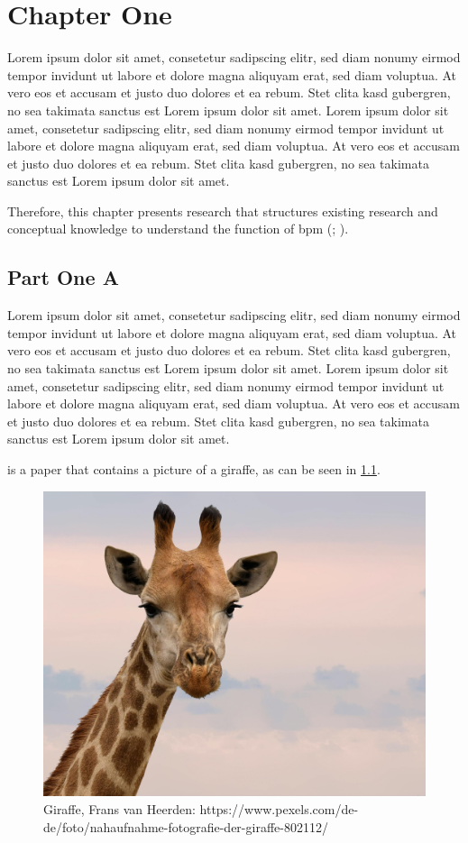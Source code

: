 \chapter{Chapter One}
\label{cha:one}

Lorem ipsum dolor sit amet, consetetur sadipscing elitr, sed diam nonumy eirmod tempor invidunt ut labore et dolore magna aliquyam erat, sed diam voluptua. At vero eos et accusam et justo duo dolores et ea rebum. Stet clita kasd gubergren, no sea takimata sanctus est Lorem ipsum dolor sit amet. Lorem ipsum dolor sit amet, consetetur sadipscing elitr, sed diam nonumy eirmod tempor invidunt ut labore et dolore magna aliquyam erat, sed diam voluptua. At vero eos et accusam et justo duo dolores et ea rebum. Stet clita kasd gubergren, no sea takimata sanctus est Lorem ipsum dolor sit amet.


Therefore, this chapter presents research that structures existing research and conceptual knowledge to understand the function of \ac{bpm} (; ). 


\section{Part One A}
\label{sec:one_a}

Lorem ipsum dolor sit amet, consetetur sadipscing elitr, sed diam nonumy eirmod tempor invidunt ut labore et dolore magna aliquyam erat, sed diam voluptua. At vero eos et accusam et justo duo dolores et ea rebum. Stet clita kasd gubergren, no sea takimata sanctus est Lorem ipsum dolor sit amet. Lorem ipsum dolor sit amet, consetetur sadipscing elitr, sed diam nonumy eirmod tempor invidunt ut labore et dolore magna aliquyam erat, sed diam voluptua. At vero eos et accusam et justo duo dolores et ea rebum. Stet clita kasd gubergren, no sea takimata sanctus est Lorem ipsum dolor sit amet.

 is a paper that contains a picture of a giraffe, as can be seen in \cref{m:fig:giraffe}.

\begin{figure}
    \centering
    \includegraphics[width=0.5\linewidth]{figures/paper_a/pexels-frans-van-heerden-201846-802112.jpg}
    \caption{Giraffe, Frans van Heerden: https://www.pexels.com/de-de/foto/nahaufnahme-fotografie-der-giraffe-802112/ }
    \label{m:fig:giraffe}
\end{figure}